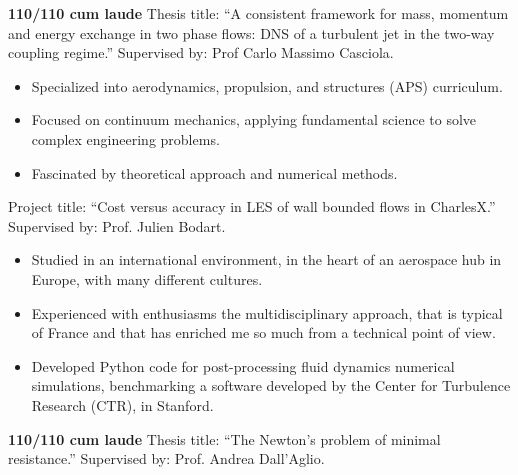 	\textbf{110/110 cum laude} Thesis title: ``A consistent framework for mass, momentum and energy exchange in two phase flows: DNS of a turbulent jet in the two-way coupling regime.'' Supervised by: Prof Carlo Massimo Casciola. \\
	\smallskip
	\begin{itemize}
		\item Specialized into aerodynamics, propulsion, and structures (APS) curriculum.
		\item Focused on continuum mechanics, applying fundamental science to solve complex engineering problems.
		\item Fascinated by theoretical approach and numerical methods.
	\end{itemize}
	\medskip

	\divider

	Project title: ``Cost versus accuracy in LES of wall bounded flows in CharlesX.'' Supervised by: Prof. Julien Bodart. \\
	\medskip
	\begin{itemize}
		\item Studied in an international environment, in the heart of an aerospace hub in Europe, with many different cultures.
		\item Experienced with enthusiasms the multidisciplinary  approach, that is typical of France and that has enriched me so much from a technical point of view.
		\item Developed Python code for post-processing fluid dynamics numerical simulations, benchmarking a software developed by the Center for Turbulence Research (CTR), in Stanford.
	\end{itemize}
	\medskip

	\divider

	\textbf{110/110 cum laude} Thesis title: ``The Newton's problem of minimal resistance.'' Supervised by: Prof. Andrea Dall'Aglio. \\
	\medskip
	\cvtag{\LaTeX}

